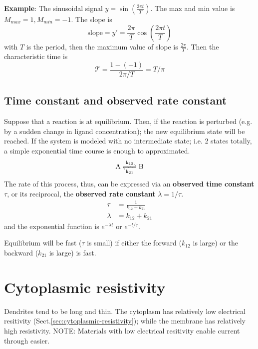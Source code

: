 {\bf Example}: The sinusoidal signal $y=\sin(\frac{2\pi t}{T})$. The
max and min value is $M_{max}=1,M_{min}=-1$. The slope is 
\begin{equation*}
  \text{slope}=y'=\frac{2\pi}{T}\cos(\frac{2\pi t}{T})
\end{equation*}
with $T$ is the period, then the maximum value of slope is
$\frac{2\pi}{T}$. Then the characteristic time is
\begin{equation}
  \label{eq:666}
  \mathcal{T} = \frac{1-(-1)}{2\pi/T} = T/\pi
\end{equation}

\subsection{Time constant and observed rate constant}
\label{sec:time-const-observ}

Suppose that a reaction is at equilibrium. Then, if the reaction is
perturbed (e.g. by a sudden change in ligand concentration); the new
equilibrium state will be reached. If the system is modeled with no
intermediate state; i.e. 2 states totally, a simple exponential time
course is enough to approximated. 
\begin{equation}
  \label{eq:843}
  \ce{A <=>[k_{12}][k_{21}] B}
\end{equation}
The rate of this process, thus, can be expressed via an {\bf observed
  time constant} $\tau$, or its reciprocal, the {\bf observed rate
  constant} $\lambda = 1/\tau$.
\begin{equation}
  \label{eq:842}
  \begin{split}
    \tau &= \frac{1}{k_{12}+k_{21}} \\
    \lambda &= k_{12} + k_{21}
  \end{split}
\end{equation}
and the exponential function is $e^{-\lambda t}$ or $e^{-t/\tau}$. 

Equilibrium will be fast ($\tau$ is small) if either the forward
($k_{12}$ is large) or the backward ($k_{21}$ is large) is fast. 



\section{Cytoplasmic resistivity}

Dendrites tend to be long and thin.
The cytoplasm has relatively low electrical resitivity
(Sect.\ref{sec:cytoplasmic-resistivity}); while the membrane has relatively high
resistivity. NOTE: Materials with low electrical resitivity enable current
through easier.




